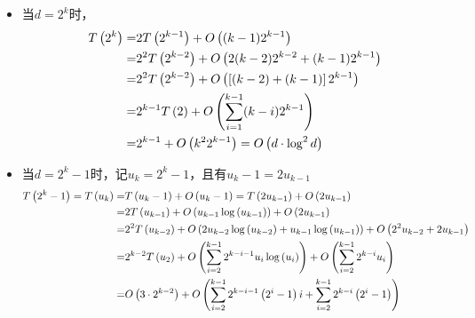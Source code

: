 \begin{questions}
\begin{solution}
        \begin{itemize}
            \item 当$d = 2^k$时，
                  \begin{align*}
                      T\left( 2^k \right)
                      = & 2 T\left(  2^{k-1}  \right) + O\left(  (k-1)2^{k-1}  \right)                    \\
                      = & 2^2 T\left(  2^{k-2}  \right) + O\left(  2(k-2) 2^{k-2} +(k-1) 2^{k-1}  \right) \\
                      = & 2^2 T\left(  2^{k-2}  \right) + O\left(  \left[  (k-2)+(k-1)  \right] 2^{k-1}  \right)    \\
                      = & 2^{k-1} T\left( 2 \right) + O\left(  \sum_{i=1}^{k-1} (k-i) 2^{k-1}  \right)    \\
                      = & 2^{k-1} + O\left(  k^{2} 2^{k-1}  \right) = O\left(  d \cdot \log^2 d  \right)
                  \end{align*}
            \item 当$d = 2^k - 1$时，记$u_k = 2^k - 1$，且有$u_k - 1 = 2u_{k-1}$
                  \begin{align*}
                      \pT{2^k - 1} = \pT{u_k}
                      = & \pT{ u_k-1 } + \pO{ u_k-1 } = \pT{ 2 u_{k-1} } + \pO{ 2 u_{k-1} }                                                      \\
                      = & 2 \pT{ u_{k-1} } + \pO{ u_{k-1} \log\pp{ u_{k-1} } } + \pO{ 2 u_{k-1} }                                                \\
                      = & 2^2 \pT{ u_{k-2} } + \pO{ 2 u_{k-2} \log\pp{ u_{k-2} } + u_{k-1} \log\pp{ u_{k-1} } } + \pO{ 2^2 u_{k-2} + 2 u_{k-1} } \\
                      = & 2^{k-2} \pT{ u_{2} } + \pO{ \sum_{i=2}^{k-1} 2^{k-i-1}u_{i} \log\pp{ u_{i} } } + \pO{ \sum_{i=2}^{k-1} 2^{k-i} u_{i} } \\
                      = & \pO{ 3 \cdot 2^{k-2} } + \pO{ \sum_{i=2}^{k-1} 2^{k-i-1}\pp{2^i-1} i + \sum_{i=2}^{k-1} 2^{k-i} \pp{2^i-1} }           \\

\end{align*}
\end{itemize}
\end{solution}
\end{questions}
